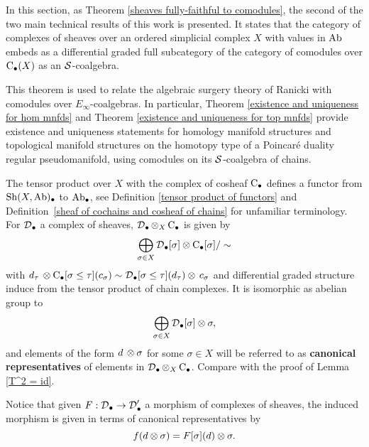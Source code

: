 \documentclass[main.tex]{subfiles}
\begin{document}
In this section, as Theorem \ref{sheaves fully-faithful to comodules}, the second of the two main technical results of this work is presented. It states that the category of complexes of sheaves over an ordered simplicial complex $X$ with values in $\Ab$ embeds as a differential graded full subcategory of the category of comodules over $\chains(X)$ as an $\S$-coalgebra.

This theorem is used to relate the algebraic surgery theory of Ranicki with comodules over $E_\infty$-coalgebras. In particular, Theorem \ref{existence and uniqueness for hom mnfds} and Theorem \ref{existence and uniqueness for top mnfds} provide existence and uniqueness statements for homology manifold structures and topological manifold structures on the homotopy type of a Poincar\'e duality regular pseudomanifold, using comodules on its $\S$-coalgebra of chains.

\begin{notation}
The tensor product over $X$ with the complex of cosheaf $\chains$ defines a functor from $\Sh(X,\Ab)_\bullet$ to $\Ab_\bullet$, see Definition \ref{tensor product of functors} and Definition~\ref{sheaf of cochains and cosheaf of chains} for unfamiliar terminology. For $\D_\bullet$ a complex of sheaves, $\D_\bullet\tensor_X\chains$ is given by
$$\bigoplus_{\sigma\in X}\D_\bullet[\sigma]\tensor\chains[\sigma]/\sim$$
with $d_\tau\,\tensor\chains[\sigma\leq\tau](c_\sigma)\sim \D_\bullet[\sigma\leq\tau](d_\tau)\tensor\,c_\sigma$ and differential graded structure induce from the tensor product of chain complexes. It is isomorphic as abelian group to
$$\bigoplus_{\sigma\in X}\D_\bullet[\sigma]\tensor\sigma,$$ and elements of the form $d\,\tensor\sigma$ for some $\sigma\in X$ will be referred to as \textbf{canonical representatives} of elements in $\D_\bullet\tensor_X\chains$. Compare with the proof of Lemma \ref{T^2 = id}.

Notice that given $F:\D_\bullet\to\D'_\bullet$ a morphism of complexes of sheaves, the induced morphism is given in terms of canonical representatives by $$f(d\tensor\sigma)=F[\sigma](d)\tensor\sigma.$$
\end{notation}
\end{document}
